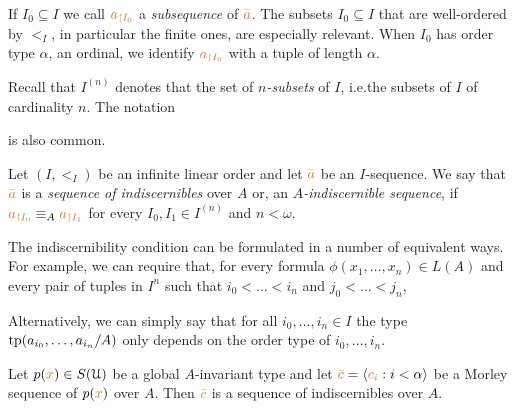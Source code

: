 \documentclass[creche.tex]{subfiles}
\begin{document}
If $I_0\subseteq I$ we call ${\color{brown} a_{\restriction I_0}}$ a \emph{subsequence\/} of ${\color{brown}\bar a}$.
The subsets $I_0\subseteq I$ that are well-ordered by $<_I$, in particular the finite ones, are especially relevant.
When $I_0$ has order type $\alpha$, an ordinal, we identify ${\color{brown} a_{\restriction I_0}}$ with a tuple of length $\alpha$.

Recall that \emph{$I^{(n)}$} denotes that the set of \emph{$n$-subsets\/} of $I$,  i.e.\@ the subsets of $I$ of cardinality $n$.
The notation \smallskip


is also common.
\begin{definition}
Let $(I,<_I)$ be an infinite linear order and let ${\color{brown}\bar a}$ be an $I$-sequence.
We say that ${\color{brown}\bar a}$ is a \emph{sequence of indiscernibles\/} over $A$ or, an \emph{$A$-indiscernible sequence\/}, if ${\color{brown} a_{\restriction I_0}}\equiv_A {\color{brown} a_{\restriction I_1}}$ for every $I_0,I_1\in I^{(n)}$ and $n<\omega$.
\QED
\end{definition}

The indiscernibility condition can be formulated in a number of equivalent ways.
For example, we can require that, for every formula $\phi(x_1,\dots,x_n)\in L(A)$ and every pair of tuples in $I^n$ such that $i_0<\dots<i_n$ and $j_0<\dots<j_n$,



Alternatively, we can simply say that for all $i_0,\dots,i_n\in I$ the type ${\rm tp}(a_{i_0},\dots,a_{i_n}/A)$ only depends on the order type of $i_0,\dots,i_n$.

\begin{proposition}
Let $p({\color{brown} x})\in S(\EuScript U)$ be a global $A$-invariant type and let ${\color{brown}\bar c}=\langle{\color{brown}c_i}:i<\alpha\rangle$ be a Morley sequence of $p({\color{brown} x})$ over $A$.
Then ${\color{brown}\bar c}$ is a sequence of indiscernibles over $A$.
\end{proposition}
\end{document}
